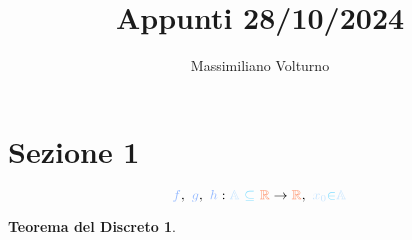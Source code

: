 \documentclass[letterpaper]{article}
\title{Appunti 28/10/2024}
\author{Massimiliano Volturno}
\newtheorem{theorem}{Teorema del Discreto}
\begin{document}
\section{Sezione 1}
\[
  \func{f}, \ \func{g}, \ \func{h} : \set{A} \ \op{\subseteq} \ \setBasic{R} \rightarrow \setBasic{R}, \ \var{x_0} \op{\in} \set{A}
\]

\begin{theorem}
  \begin{equation}

  \end{equation}
\end{theorem}
\end{document}
